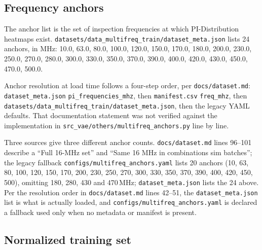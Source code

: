 \subsection{Frequency anchors}
\label{subsec:appA_anchors}

The anchor list is the set of inspection frequencies at which PI-Distribution heatmaps exist.
\texttt{datasets/\allowbreak{}data\_\allowbreak{}multifreq\_\allowbreak{}train/\allowbreak{}dataset\_\allowbreak{}meta.json} lists 24 anchors, in MHz:
10.0, 63.0, 80.0, 100.0, 120.0, 150.0, 170.0, 180.0, 200.0, 230.0, 250.0, 270.0, 280.0, 300.0,
330.0, 350.0, 370.0, 390.0, 400.0, 420.0, 430.0, 450.0, 470.0, 500.0.

Anchor resolution at load time follows a four-step order, per \texttt{docs/dataset.md}:
\texttt{dataset\_meta.json} \texttt{pi\_frequencies\_mhz}, then \texttt{manifest.csv}
\texttt{freq\_mhz}, then \texttt{datasets/\allowbreak{}data\_\allowbreak{}multifreq\_\allowbreak{}train/\allowbreak{}dataset\_\allowbreak{}meta.json}, then the
legacy YAML defaults. That documentation statement was not verified against the implementation in
\texttt{src\_\allowbreak{}vae/\allowbreak{}others/\allowbreak{}multifreq\_\allowbreak{}anchors.py} line by line.

Three sources give three different anchor counts. \texttt{docs/dataset.md} lines 96--101 describe a
``Full 16-MHz set'' and ``Same 16 MHz in combinations sim batches''; the legacy fallback
\texttt{configs/multifreq\_anchors.yaml} lists 20 anchors (10, 63, 80, 100, 120, 150, 170, 200,
230, 250, 270, 300, 330, 350, 370, 390, 400, 420, 450, 500), omitting 180, 280, 430 and 470\,MHz;
\texttt{dataset\_meta.json} lists the 24 above. Per the resolution order in
\texttt{docs/dataset.md} lines 42--51, the \texttt{dataset\_meta.json} list is what is actually
loaded, and \texttt{configs/multifreq\_anchors.yaml} is declared a fallback used only when no
metadata or manifest is present.


\subsection{Normalized training set}
\label{subsec:appA_norm_set}

